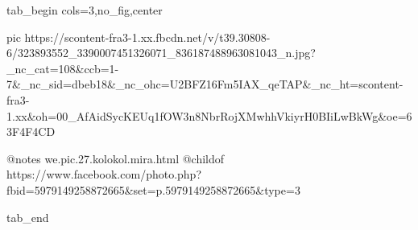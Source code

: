  
 
 
 
 


\ifcmt
  tab_begin cols=3,no_fig,center

     pic https://scontent-fra3-1.xx.fbcdn.net/v/t39.30808-6/323893552_3390007451326071_836187488963081043_n.jpg?_nc_cat=108&ccb=1-7&_nc_sid=dbeb18&_nc_ohc=U2BFZ16Fm5IAX_qeTAP&_nc_ht=scontent-fra3-1.xx&oh=00_AfAidSycKEUq1fOW3n8NbrRojXMwhhVkiyrH0BIiLwBkWg&oe=63F4F4CD

		 @notes we.pic.27.kolokol.mira.html
		 @childof https://www.facebook.com/photo.php?fbid=5979149258872665&set=p.5979149258872665&type=3

  tab_end
\fi
